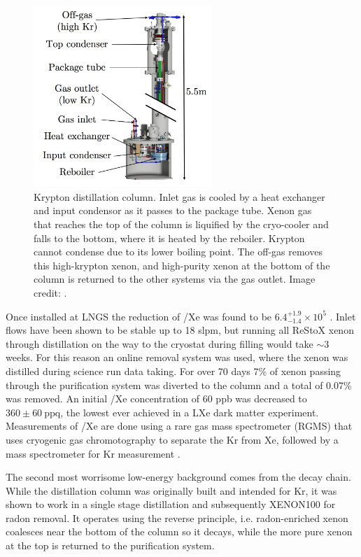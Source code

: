 \begin{figure}
\centering
\includegraphics[width=0.6\textwidth]{KrColumn}
\caption[Krypton distillation column.]{Krypton distillation column.  Inlet gas is cooled by a heat exchanger and input condensor as it passes
to the package tube.  Xenon gas that reaches the top of the
column is liquified by the cryo-cooler and falls to the bottom, where it is heated by the reboiler.  Krypton cannot condense due to its
lower boiling point.  The off-gas removes this high-krypton xenon, and high-purity xenon at the bottom of the column is returned to the
other systems via the gas outlet.  Image credit: .}
\label{fig:xeno1t_kr_dist_column}
\end{figure}

Once installed at LNGS the reduction of /Xe was found to be $6.4_{-1.4}^{+1.9} \times 10^{5}$
.  Inlet flows have been shown to be stable up to 18 slpm, but running all ReStoX xenon through distillation on the
way to the cryostat during filling would take ${\sim}3$ weeks.  For this reason an online removal system was used, where the xenon was
distilled during
science run data taking.  For over 70 days 7\% of xenon passing through the purification system was diverted to the column and a total
of 0.07\% was
removed.  An initial /Xe concentration of 60 ppb was decreased to $360 \pm 60\ \mathrm{ppq}$, the lowest ever achieved in a
LXe dark matter experiment.  Measurements of /Xe are done using a rare gas mass spectrometer (RGMS) that uses cryogenic gas
chromotography to separate the Kr from Xe, followed by a mass spectrometer for Kr measurement .

The second most worrisome low-energy background comes from the  decay chain.  While the distillation column was originally
built and intended for Kr,
it was shown to work in a single stage distillation  and subsequently XENON100
 for radon removal.  It operates using the reverse principle, i.e. radon-enriched xenon coalesces near the bottom
of the column so it decays, while the more pure xenon at the top is returned to the purification system.



